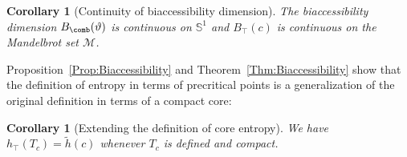 \documentclass[12pt]{amsart}
\newcommand{\Circle}{\mathbb S^1}
\newcommand{\0}{\texttt{0}}
\newcommand{\1}{\texttt{1}}
\newtheorem{corollary}[theorem]{Corollary}
\theoremstyle{definition}
\numberwithin{equation}{section}
\renewcommand{\theta}{\vartheta}
\newcommand{\lineclear}{\rule{0pt}{2pt}\newline}
\begin{document}
\begin{corollary}[Continuity of biaccessibility dimension]
\lineclear
The biaccessibility dimension $B_\comb(\theta)$ is continuous on $\Circle$ and
$B_\top(c)$ is continuous on the Mandelbrot set $\mathcal{M}$.
\end{corollary}

Proposition~\ref{Prop:Biaccessibility} and Theorem~\ref{Thm:Biaccessibility}
show that the definition
of entropy in terms of precritical points is a generalization
of the original definition in terms of a compact core:


\begin{corollary}[Extending the definition of core entropy]
\lineclear
We have $h_\top(T_c)=\tilde h(c)$ whenever $T_c$ is defined and compact.
\end{corollary}



\end{document}
